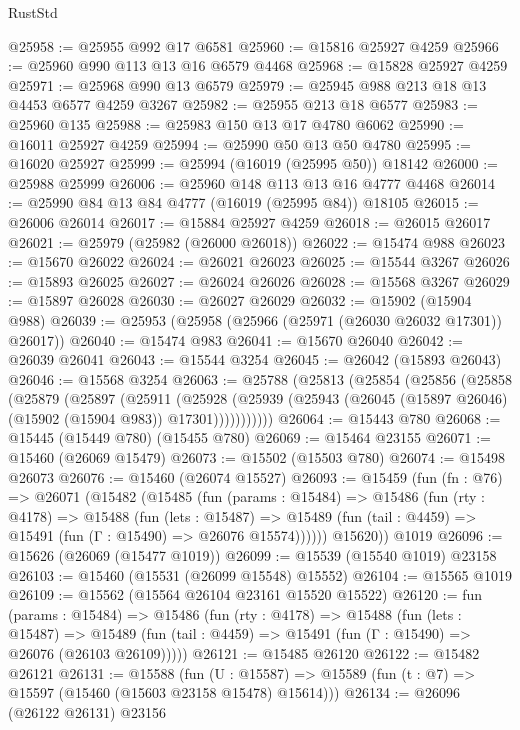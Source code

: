 \begin{lexlean}{RustStd}
\begin{coremodule}
@25958 := @25955 @992 @17 @6581
@25960 := @15816 @25927 @4259
@25966 := @25960 @990 @113 @13 @16 @6579 @4468
@25968 := @15828 @25927 @4259
@25971 := @25968 @990 @13 @6579
@25979 := @25945 @988 @213 @18 @13 @4453 @6577 @4259 @3267
@25982 := @25955 @213 @18 @6577
@25983 := @25960 @135
@25988 := @25983 @150 @13 @17 @4780 @6062
@25990 := @16011 @25927 @4259
@25994 := @25990 @50 @13 @50 @4780
@25995 := @16020 @25927
@25999 := @25994 (@16019 (@25995 @50)) @18142
@26000 := @25988 @25999
@26006 := @25960 @148 @113 @13 @16 @4777 @4468
@26014 := @25990 @84 @13 @84 @4777 (@16019 (@25995 @84)) @18105
@26015 := @26006 @26014
@26017 := @15884 @25927 @4259
@26018 := @26015 @26017
@26021 := @25979 (@25982 (@26000 @26018))
@26022 := @15474 @988
@26023 := @15670 @26022
@26024 := @26021 @26023
@26025 := @15544 @3267
@26026 := @15893 @26025
@26027 := @26024 @26026
@26028 := @15568 @3267
@26029 := @15897 @26028
@26030 := @26027 @26029
@26032 := @15902 (@15904 @988)
@26039 := @25953 (@25958 (@25966 (@25971 (@26030 @26032 @17301)) @26017))
@26040 := @15474 @983
@26041 := @15670 @26040
@26042 := @26039 @26041
@26043 := @15544 @3254
@26045 := @26042 (@15893 @26043)
@26046 := @15568 @3254
@26063 := @25788
    (@25813
      (@25854
        (@25856
          (@25858
            (@25879
              (@25897
                (@25911
                  (@25928
                    (@25939 (@25943 (@26045 (@15897 @26046) (@15902 (@15904 @983)) @17301)))))))))))
@26064 := @15443 @780
@26068 := @15445 (@15449 @780) (@15455 @780)
@26069 := @15464 @23155
@26071 := @15460 (@26069 @15479)
@26073 := @15502 (@15503 @780)
@26074 := @15498 @26073
@26076 := @15460 (@26074 @15527)
@26093 := @15459
    (fun (fn : @76) =>
    @26071
      (@15482
        (@15485
          (fun (params : @15484) =>
          @15486
            (fun (rty : @4178) =>
            @15488
              (fun (lets : @15487) =>
              @15489 (fun (tail : @4459) => @15491 (fun (Γ : @15490) => @26076 @15574))))))
        @15620))
    @1019
@26096 := @15626 (@26069 (@15477 @1019))
@26099 := @15539 (@15540 @1019) @23158
@26103 := @15460 (@15531 (@26099 @15548) @15552)
@26104 := @15565 @1019
@26109 := @15562 (@15564 @26104 @23161 @15520 @15522)
@26120 := fun (params : @15484) =>
  @15486
    (fun (rty : @4178) =>
    @15488
      (fun (lets : @15487) =>
      @15489 (fun (tail : @4459) => @15491 (fun (Γ : @15490) => @26076 (@26103 @26109)))))
@26121 := @15485 @26120
@26122 := @15482 @26121
@26131 := @15588
    (fun (U : @15587) => @15589 (fun (t : @7) => @15597 (@15460 (@15603 @23158 @15478) @15614)))
@26134 := @26096 (@26122 @26131) @23156

\end{coremodule}
\end{lexlean}
